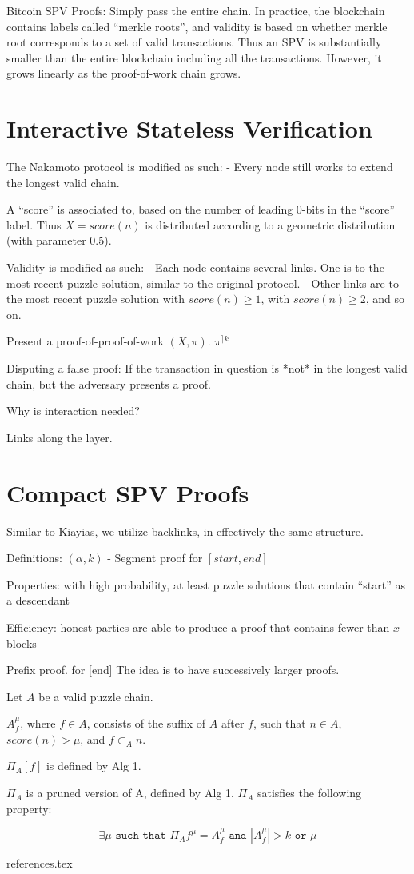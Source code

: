 \documentclass[11pt]{llncs}
\begin{document}
Bitcoin SPV Proofs:
	Simply pass the entire chain.
	In practice, the blockchain contains labels called “merkle roots”, and validity is based on whether merkle root corresponds to a set of valid transactions. Thus an SPV is substantially smaller than the entire blockchain including all the transactions. However, it grows linearly as the proof-of-work chain grows.

\section{Interactive Stateless Verification}

The Nakamoto protocol is modified as such:
- Every node still works to extend the longest valid chain.

A “score” is associated to, based on the number of leading 0-bits in the
“score” label. Thus $X = score(n)$ is distributed according to a geometric distribution (with parameter 0.5).

Validity is modified as such:
- Each node contains several links. One is to the most recent puzzle solution, similar to the original protocol.
- Other links are to the most recent puzzle solution with $score(n) \geq
1$,  with $score(n) \geq 2$, and so on.

Present a proof-of-proof-of-work $(X, \pi)$. $\pi^{\rceil k}$

Disputing a false proof:
    If the transaction in question is *not* in the longest valid chain, but the adversary presents a proof.

Why is interaction needed?

Links along the layer.

\section{Compact SPV Proofs}

Similar to Kiayias, we utilize backlinks, in effectively the same structure.

Definitions:
$(\alpha, k)$ - Segment proof for $[start, end]$

Properties:
with high probability, at least puzzle solutions that contain “start” as a descendant

Efficiency:
	honest parties are able to produce a proof that contains fewer than $x$ blocks

Prefix proof.  for [end]
    The idea is to have successively larger proofs.

Let $A$ be a valid puzzle chain.

$A_{f}^{\mu}$, where $f \in A$, consists of the suffix of $A$ after
$f$, such that $n \in A$, $score(n) > \mu$, and $f \subset_A n$.

$\Pi_A[f]$  is defined by Alg 1.

$\Pi_{A}$ is a pruned version of A, defined by Alg 1.
$\Pi_{A}$ satisfies the following property:

\begin{equation*}
    \exists \mu \texttt{ such that } \Pi_{A}{f}^{\mu} = A_f^{\mu}
    \texttt{ and }
    |A_f^{\mu}| > k
    \texttt{ or } \mu
\end{equation*}

{references.tex}
\end{document}
